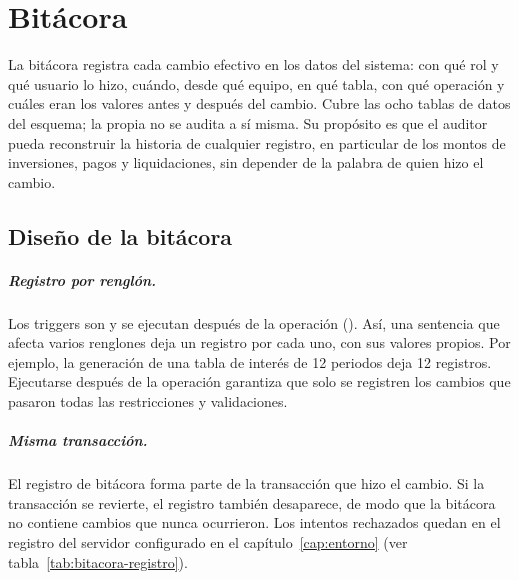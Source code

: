 \chapter{Bitácora}
\label{cap:bitacora}

La bitácora registra cada cambio efectivo en los datos del sistema: con qué rol y qué usuario lo hizo, cuándo, desde qué equipo, en qué tabla, con qué operación y cuáles eran los valores antes y después del cambio. Cubre las ocho tablas de datos del esquema; la propia  no se audita a sí misma. Su propósito es que el auditor pueda reconstruir la historia de cualquier registro, en particular de los montos de inversiones, pagos y liquidaciones, sin depender de la palabra de quien hizo el cambio.

\section{Diseño de la bitácora}

\paragraph{Registro por renglón.} Los triggers son  y se ejecutan después de la operación (). Así, una sentencia que afecta varios renglones deja un registro por cada uno, con sus valores propios. Por ejemplo, la generación de una tabla de interés de 12 periodos deja 12 registros. Ejecutarse después de la operación garantiza que solo se registren los cambios que pasaron todas las restricciones y validaciones.

\paragraph{Misma transacción.} El registro de bitácora forma parte de la transacción que hizo el cambio. Si la transacción se revierte, el registro también desaparece, de modo que la bitácora no contiene cambios que nunca ocurrieron. Los intentos rechazados quedan en el registro del servidor configurado en el capítulo~\ref{cap:entorno} (ver tabla~\ref{tab:bitacora-registro}).

